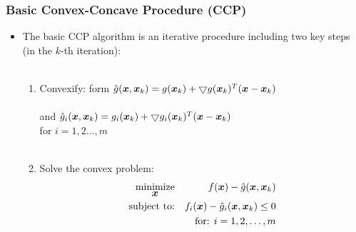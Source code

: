 \documentclass [t] {beamer} %
\begin{document}
\begin{frame}  %
\frametitle{Basic Convex-Concave Procedure (CCP)} 
\phantom{m}
\begin{itemize}
\item
 The basic CCP algorithm is an iterative procedure including two key steps (in the $k$-th iteration): \\~\\%
\begin{enumerate}
\item
Convexify: form $\hat{g}(\mbox{\boldmath$x$},\mbox{\boldmath$x$}_k)  =   g(\mbox{\boldmath$x$}_k) +  \bigtriangledown g(\mbox{\boldmath$x$}_k)^T(\mbox{\boldmath$x$} - \mbox{\boldmath$x$}_k) $ \\~\\
 \qquad \qquad  \quad and $\hat{g}_i(\mbox{\boldmath$x$},\mbox{\boldmath$x$}_k)  =   g_i(\mbox{\boldmath$x$}_k) +  \bigtriangledown g_i(\mbox{\boldmath$x$}_k)^T(\mbox{\boldmath$x$} - \mbox{\boldmath$x$}_k) $ \\
 \qquad \qquad \qquad for $ i = 1, 2 \ldots, m $
\\~\\
\item
Solve  the convex problem:
\linespread{0.1}\selectfont
\begin{eqnarray} 
 \mathop{\mbox{minimize}}_{\mbox{\boldmath$x$}} & &  f(\mbox{\boldmath$x$}) - \hat{g}(\mbox{\boldmath$x$}, \mbox{\boldmath$x$}_k) \nonumber
\\ \mbox{subject to:} & &  f_i(\mbox{\boldmath$x$}) -  \hat{g}_i(\mbox{\boldmath$x$}, \mbox{\boldmath$x$}_k) \leq 0   \nonumber
\\ \quad & & \mbox{for: }  i = 1, 2, \ldots, m \nonumber
\end{eqnarray} \\~\\
\linespread{1}\selectfont
\end{enumerate}

\end{itemize}
\end{frame}
\end{document}

